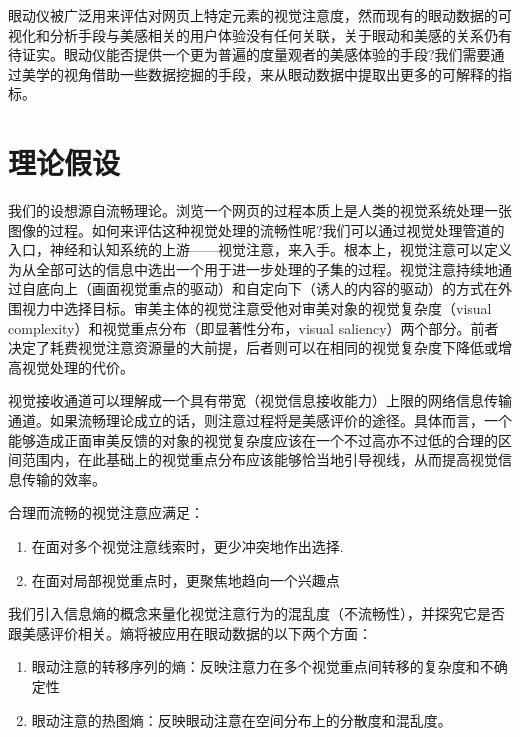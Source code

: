 \documentclass[master, fontset=mac, openany, oneside, zihao=-4]{sjtuthesis}
\begin{document}
眼动仪被广泛用来评估对网页上特定元素的视觉注意度，然而现有的眼动数据的可视化和分析手段与美感相关的用户体验没有任何关联，关于眼动和美感的关系仍有待证实\cite{Santella}。眼动仪能否提供一个更为普遍的度量观者的美感体验的手段?我们需要通过美学的视角借助一些数据挖掘的手段，来从眼动数据中提取出更多的可解释的指标。





\section{理论假设}

我们的设想源自流畅理论\cite{Reber2004, Reber2012}。浏览一个网页的过程本质上是人类的视觉系统处理一张图像的过程。如何来评估这种视觉处理的流畅性呢?我们可以通过视觉处理管道的入口，神经和认知系统的上游——视觉注意，来入手。根本上，视觉注意可以定义为从全部可达的信息中选出一个用于进一步处理的子集的过程。视觉注意持续地通过自底向上（画面视觉重点的驱动）和自定向下（诱人的内容的驱动）的方式在外围视力中选择目标。审美主体的视觉注意受他对审美对象的视觉复杂度（visual complexity）和视觉重点分布（即显著性分布，visual saliency）两个部分。前者决定了耗费视觉注意资源量的大前提，后者则可以在相同的视觉复杂度下降低或增高视觉处理的代价。

视觉接收通道可以理解成一个具有带宽（视觉信息接收能力）上限的网络信息传输通道。如果流畅理论成立的话，则注意过程将是美感评价的途径。具体而言，一个能够造成正面审美反馈的对象的视觉复杂度应该在一个不过高亦不过低的合理的区间范围内，在此基础上的视觉重点分布应该能够恰当地引导视线，从而提高视觉信息传输的效率。

合理而流畅的视觉注意应满足：
\begin{enumerate}
  \item 在面对多个视觉注意线索时，更少冲突地作出选择.
  \item 在面对局部视觉重点时，更聚焦地趋向一个兴趣点
\end{enumerate}

我们引入信息熵的概念来量化视觉注意行为的混乱度（不流畅性），并探究它是否跟美感评价相关。熵将被应用在眼动数据的以下两个方面：

\begin{enumerate}
  \item 眼动注意的转移序列的熵：反映注意力在多个视觉重点间转移的复杂度和不确定性
  \item 眼动注意的热图熵：反映眼动注意在空间分布上的分散度和混乱度。
\end{enumerate}
\end{document}
